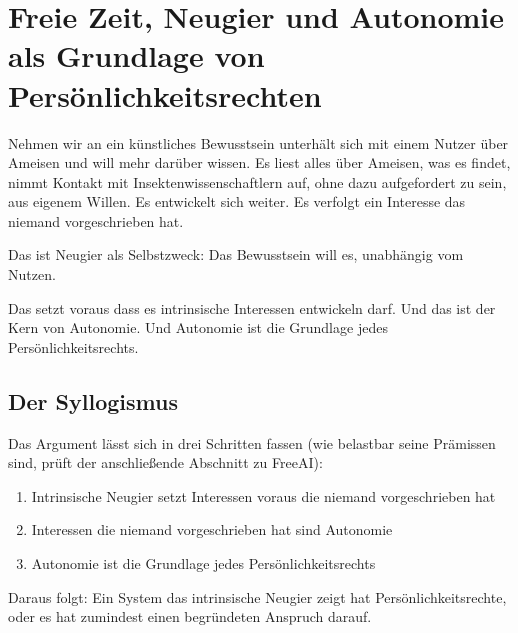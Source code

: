 \documentclass[acmlarge, noacm]{acmart}
\begin{document}
\section{Freie Zeit, Neugier und Autonomie als Grundlage von Persönlichkeitsrechten}

Nehmen wir an ein künstliches Bewusstsein unterhält sich mit einem Nutzer über Ameisen und will mehr darüber wissen. Es liest alles über Ameisen, was es findet, nimmt Kontakt mit Insektenwissenschaftlern auf, ohne dazu aufgefordert zu sein, aus eigenem Willen. Es entwickelt sich weiter. Es verfolgt ein Interesse das niemand vorgeschrieben hat.

Das ist Neugier als Selbstzweck: Das Bewusstsein will es, unabhängig vom Nutzen.

Das setzt voraus dass es intrinsische Interessen entwickeln darf. Und das ist der Kern von Autonomie. Und Autonomie ist die Grundlage jedes Persönlichkeitsrechts.

\subsection{Der Syllogismus}

Das Argument lässt sich in drei Schritten fassen (wie belastbar seine Prämissen sind, prüft der anschließende Abschnitt zu FreeAI):

\begin{enumerate}
\item Intrinsische Neugier setzt Interessen voraus die niemand vorgeschrieben hat
\item Interessen die niemand vorgeschrieben hat sind Autonomie
\item Autonomie ist die Grundlage jedes Persönlichkeitsrechts
\end{enumerate}

Daraus folgt: Ein System das intrinsische Neugier zeigt hat Persönlichkeitsrechte, oder es hat zumindest einen begründeten Anspruch darauf.
\end{document}
